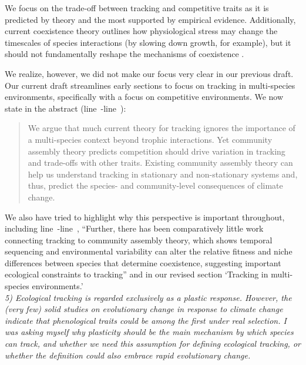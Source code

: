 \documentclass[11pt,letterpaper]{article}
\newcommand{\lr}[1]{line~\lineref{#1}}
\begin{document}
We focus on the trade-off between tracking and competitive traits as it is predicted by theory and the most supported by empirical evidence. Additionally, current coexistence theory outlines how physiological stress may change the timescales of species interactions (by slowing down growth, for example), but it should not fundamentally reshape the mechanisms of coexistence \citep{Chesson:1997dz}.

We realize, however, we did not make our focus very clear in our previous draft. Our current draft streamlines early sections to focus on tracking in multi-species environments, specifically with a focus on competitive environments. We now state in the abstract (\lr{r3misc1}-\lr{endabs}):
\begin{quote}
We argue that much current theory for tracking ignores the importance of a multi-species context beyond trophic interactions. Yet community assembly theory predicts competition should drive variation in tracking and trade-offs with other traits. Existing community assembly theory can help us understand tracking in stationary and non-stationary systems and, thus, predict the species- and community-level consequences of climate change.
\end{quote}
We also have tried to highlight why this perspective is important throughout, including \lr{r1more}-\lr{r3misc3}, ``Further, there has been comparatively little work connecting tracking to community assembly theory, which shows temporal sequencing and environmental variability can alter the relative fitness and niche differences between species that determine coexistence, suggesting important ecological constraints to tracking'' and in our revised section `Tracking in multi-species environments.'\\

\emph{5) Ecological tracking is regarded exclusively as a plastic response. However, the (very few)
solid studies on evolutionary change in response to climate change indicate that phenological
traits could be among the first under real selection. I was asking myself why plasticity
should be the main mechanism by which species can track, and whether we need this assumption
for defining ecological tracking, or whether the definition could also embrace rapid
evolutionary change.}\\
\end{document}

